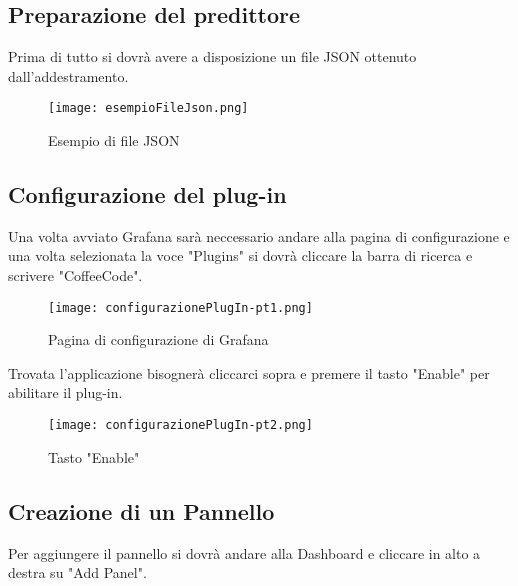 \documentclass[../manuale-utente.tex]{subfiles}
\begin{document}
\subsection{Preparazione del predittore}
\label{subs:preparazione-del-predittore}
Prima di tutto si dovrà avere a disposizione un file JSON ottenuto dall'addestramento.

\begin{figure}[h!]
  \begin{center}
    \texttt{[image: esempioFileJson.png]}\\
    \caption{Esempio di file JSON}%
    \label{fig:esempio-filejson}
  \end{center}
\end{figure}

\subsection{Configurazione del plug-in}
\label{subs:configurazione-plug-in}
Una volta avviato Grafana sarà neccessario andare alla pagina di configurazione e una volta selezionata la voce "Plugins" si
dovrà cliccare la barra di ricerca e scrivere "CoffeeCode".

\begin{figure}[h!]
  \begin{center}
    \texttt{[image: configurazionePlugIn-pt1.png]}\\
    \caption{Pagina di configurazione di Grafana}%
    \label{fig:pagina-di-configurazione}
  \end{center}
\end{figure}

Trovata l'applicazione bisognerà cliccarci sopra e premere il tasto "Enable" per abilitare il plug-in.

\begin{figure}[h!]
  \begin{center}
    \texttt{[image: configurazionePlugIn-pt2.png]}\\
    \caption{Tasto "Enable"}%
    \label{fig:tasto-enable}
  \end{center}
\end{figure}

\newpage
\subsection{Creazione di un Pannello}
\label{subs:creazione-di-un-pannello}
Per aggiungere il pannello si dovrà andare alla Dashboard e cliccare in alto a destra su "Add Panel".
\end{document}
